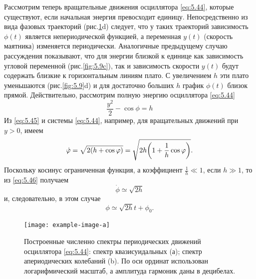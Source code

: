 Рассмотрим теперь вращательные движения осциллятора \eqref{eq:5.44}, которые
существуют, если начальная энергия превосходит единицу. Непосредственно из
вида фазовых траекторий (рис.\ref{fig:5.10}d) следует, что у таких траекторий
зависимость $\phi(t)$ является непериодической функцией, а переменная $y(t)$
(скорость маятника) изменяется периодически. Аналогичные предыдущему
случаю рассуждения показывают, что для энергии близкой к единице как
зависимость угловой переменной (рис.\ref{fig:5.9c}), так и зависимость скорости $y(t)$
будут содержать близкие к горизонтальным линиям плато. С увеличением $h$ эти
плато уменьшаются (рис.\ref{fig:5.9}d) и для достаточно больших $h$ график $\phi(t)$ близок
прямой. Действительно, рассмотрим полную энергию осциллятора \eqref{eq:5.44}
\begin{equation}
        \label{eq:5.45}
        \frac{y^2}{2} - \cos \phi = h
\end{equation}
Из \eqref{eq:5.45} и системы \eqref{eq:5.44}, например, для вращательных движений при $y>0$, имеем
\begin{equation}
        \label{eq:5.46}
        \dot {\varphi} = \sqrt{ 2 \qty(h+ \cos \varphi)} = \sqrt{ 2h \qty( 1 + \frac{1}{h} \cos \varphi)}.
\end{equation}
Поскольку косинус ограниченная функция, а коэффициент $\frac{1}{h} \ll 1$, если $h \gg 1$,
то из \eqref{eq:5.46} получаем
\begin{equation}
        \label{eq:}
        \dot \phi \simeq \sqrt{2 h}
\end{equation}
и, следовательно, в этом случае
\begin{equation}
        \label{eq:}
        \phi \simeq \sqrt{2h} t + \phi_0.
\end{equation}

\begin{figure}[h]
        \centering
        \texttt{[image: example-image-a]}
        \caption{Построенные численно спектры периодических движений осциллятора \eqref{eq:5.44}:
        спектр квазисуидальных (а); спектр апериодических колебаний (b). 
По оси ординат использован логарифмический масштаб, а амплитуда гармоник даны в децибелах.}
        \label{fig:5.10}
\end{figure}


